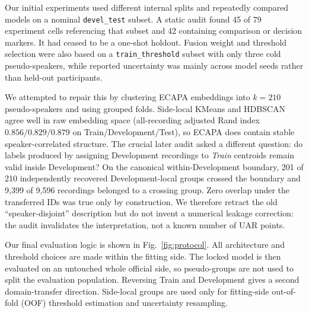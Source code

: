 Our initial experiments used different internal splits and repeatedly compared
models on a nominal \texttt{devel\_test} subset. A static audit found 45 of 79
experiment cells referencing that subset and 42 containing comparison or
decision markers. It had ceased to be a one-shot holdout. Fusion weight and
threshold selection were also based on a \texttt{train\_threshold} subset with
only three cold pseudo-speakers, while reported uncertainty was mainly across
model seeds rather than held-out participants.

We attempted to repair this by clustering ECAPA embeddings into $k=210$
pseudo-speakers and using grouped folds. Side-local KMeans and HDBSCAN agree
well in raw embedding space (all-recording adjusted Rand index
$0.856/0.829/0.879$ on Train/Development/Test), so ECAPA does contain stable
speaker-correlated structure. The crucial later audit asked a different
question: do labels produced by assigning Development recordings to
\emph{Train} centroids remain valid inside Development? On the canonical
within-Development boundary, 201 of 210 independently recovered
Development-local groups crossed the boundary and 9,399 of 9,596 recordings
belonged to a crossing group. Zero overlap under the transferred IDs was true
only by construction. We therefore retract the old ``speaker-disjoint''
description but do not invent a numerical leakage correction: the audit
invalidates the interpretation, not a known number of UAR points.

Our final evaluation logic is shown in Fig.~\ref{fig:protocol}. All architecture
and threshold choices are made within the fitting side. The locked model is
then evaluated on an untouched whole official side, so pseudo-groups are not
used to split the evaluation population. Reversing Train and Development gives
a second domain-transfer direction. Side-local groups are used only for
fitting-side out-of-fold (OOF) threshold estimation and uncertainty
resampling.

